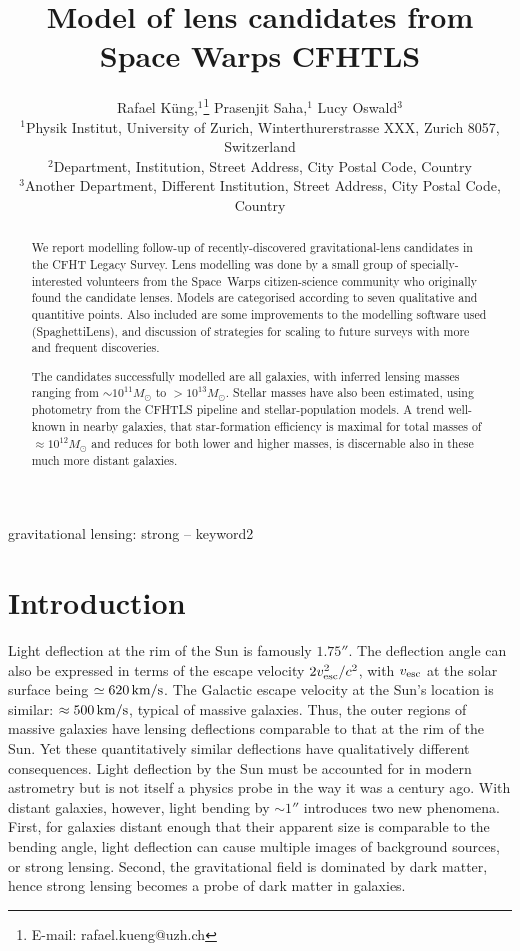 \documentclass[fleqn,usenatbib]{mnras}
\title[Short title, max. 45 characters]{Model of lens candidates from
  Space Warps CFHTLS}
\author[R. K\"ung et al.]{
Rafael K\"ung,$^{1}$\thanks{E-mail: rafael.kueng@uzh.ch}
Prasenjit Saha,$^{1}$
Lucy Oswald$^{3}$
\\
$^{1}$Physik Institut, University of Zurich, Winterthurerstrasse XXX, Zurich 8057, Switzerland\\
$^{2}$Department, Institution, Street Address, City Postal Code, Country\\
$^{3}$Another Department, Different Institution, Street Address, City Postal Code, Country
}
\begin{document}
\label{firstpage}
\pagerange{\pageref{firstpage}--\pageref{lastpage}}
\maketitle

\begin{abstract}
We report modelling follow-up of recently-discovered
gravitational-lens candidates in the CFHT Legacy Survey.  Lens
modelling was done by a small group of specially-interested volunteers
from the Space~Warps citizen-science community who originally found
the candidate lenses.  Models are categorised according to seven
qualitative and quantitive points.  Also included are some
improvements to the modelling software used (SpaghettiLens),
and discussion of strategies for scaling to future surveys
with more and frequent discoveries.

The candidates successfully modelled are all galaxies, with inferred
lensing masses ranging from $\sim10^{11}M_\odot$ to $>10^{13}M_\odot$.
Stellar masses have also been estimated, using photometry from the
CFHTLS pipeline and stellar-population models.  A trend well-known
in nearby galaxies, that star-formation efficiency is maximal for
total masses of $\approx10^{12}M_\odot$ and reduces for both lower and
higher masses, is discernable also in these much more distant
galaxies.
\end{abstract}

\begin{keywords}
gravitational lensing: strong -- keyword2
\end{keywords}

\section{Introduction}

Light deflection at the rim of the Sun is famously $1.75''$.  The
deflection angle can also be expressed in terms of the escape velocity
$2v_{\rm esc}^2/c^2$, with $v_{\rm esc}$ at the solar surface being
$\simeq620\rm\,km/s$.  The Galactic escape velocity at the Sun's
location is similar: $\approx500\rm\,km/s$, typical of massive
galaxies.  Thus, the outer regions of massive galaxies have lensing
deflections comparable to that at the rim of the Sun.  Yet these
quantitatively similar deflections have qualitatively different
consequences.  Light deflection by the Sun must be accounted for in
modern astrometry \citep[see e.g.,][]{2015CQGra..32p5008C} but is not
itself a physics probe in the way it was a century ago.  With distant
galaxies, however, light bending by $\sim1''$ introduces two new
phenomena.  First, for galaxies distant enough that their apparent
size is comparable to the bending angle, light deflection can cause
multiple images of background sources, or strong lensing.  Second, the
gravitational field is dominated by dark matter, hence strong lensing
becomes a probe of dark matter in galaxies.
\end{document}
